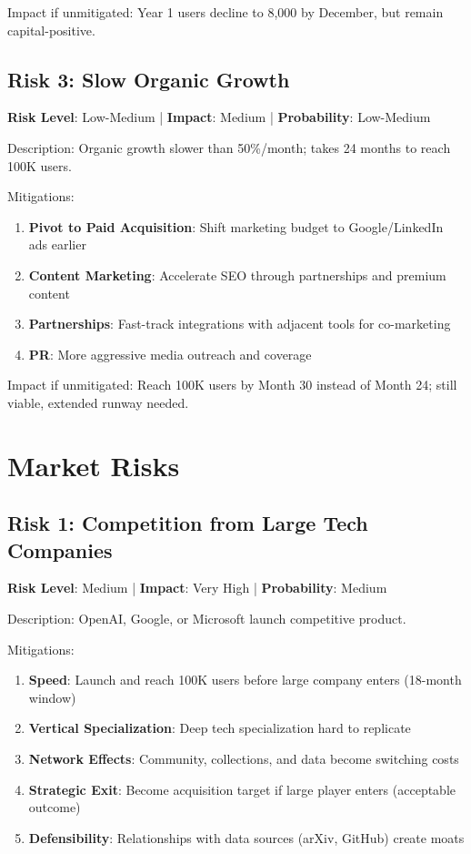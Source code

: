 \documentclass{report}
\begin{document}
Impact if unmitigated: Year 1 users decline to 8,000 by December, but remain capital-positive.

\subsection{Risk 3: Slow Organic Growth}

\textbf{Risk Level}: Low-Medium | \textbf{Impact}: Medium | \textbf{Probability}: Low-Medium

Description: Organic growth slower than 50\%/month; takes 24 months to reach 100K users.

Mitigations:
\begin{enumerate}
    \item \textbf{Pivot to Paid Acquisition}: Shift marketing budget to Google/LinkedIn ads earlier
    \item \textbf{Content Marketing}: Accelerate SEO through partnerships and premium content
    \item \textbf{Partnerships}: Fast-track integrations with adjacent tools for co-marketing
    \item \textbf{PR}: More aggressive media outreach and coverage
\end{enumerate}

Impact if unmitigated: Reach 100K users by Month 30 instead of Month 24; still viable, extended runway needed.

\section{Market Risks}

\subsection{Risk 1: Competition from Large Tech Companies}

\textbf{Risk Level}: Medium | \textbf{Impact}: Very High | \textbf{Probability}: Medium

Description: OpenAI, Google, or Microsoft launch competitive product.

Mitigations:
\begin{enumerate}
    \item \textbf{Speed}: Launch and reach 100K users before large company enters (18-month window)
    \item \textbf{Vertical Specialization}: Deep tech specialization hard to replicate
    \item \textbf{Network Effects}: Community, collections, and data become switching costs
    \item \textbf{Strategic Exit}: Become acquisition target if large player enters (acceptable outcome)
    \item \textbf{Defensibility}: Relationships with data sources (arXiv, GitHub) create moats
\end{enumerate}
\end{document}
